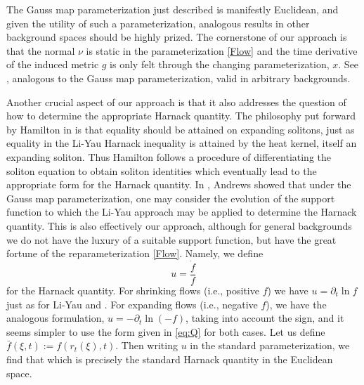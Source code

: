The Gauss map parameterization just described is manifestly Euclidean, and given the utility of such a parameterization, analogous results in other background spaces should be highly prized. The cornerstone of our approach is that the normal \(\nu\) is static in the parameterization \eqref{Flow} and the time derivative of the induced metric \(g\) is only felt through the changing parameterization, $x$. See , analogous to the Gauss map parameterization, valid in arbitrary backgrounds.

Another crucial aspect of our approach is that it also addresses the question of how to determine the appropriate Harnack quantity. The philosophy put forward by Hamilton in \cite{Hamilton:/1993,Hamilton:/1995} is that equality should be attained on expanding solitons, just as equality in the Li-Yau Harnack inequality \cite{LiYau:/1986} is attained by the heat kernel, itself an expanding soliton. Thus Hamilton follows a procedure of differentiating the soliton equation to obtain soliton identities which eventually lead to the appropriate form for the Harnack quantity. In \cite{Andrews:09/1994}, Andrews showed that under the Gauss map parameterization, one may consider the evolution of the support function to which the Li-Yau approach may be applied to determine the Harnack quantity. This is also effectively our approach, although for general backgrounds we do not have the luxury of a suitable support function, but have the great fortune of the reparameterization \eqref{Flow}. Namely, we define
\begin{equation}
\label{eq:Q}
u = \frac{\dot{f}}{f}
\end{equation}
for the Harnack quantity. For shrinking flows (i.e., positive $f$) we have $u = \partial_t \ln f$ just as for Li-Yau \cite{LiYau:/1986} and \cite{Andrews:09/1994}. For expanding flows (i.e., negative $f$), we have the analogous formulation, $u = - \partial_t \ln (-f)$, taking into account the sign, and it seems simpler to use the form given in \eqref{eq:Q} for both cases. Let us define $\bar{f}(\xi,t):=f(r_t(\xi), t).$ Then writing $u$ in the standard parameterization, we find that
which is precisely the standard Harnack quantity in the Euclidean space.


